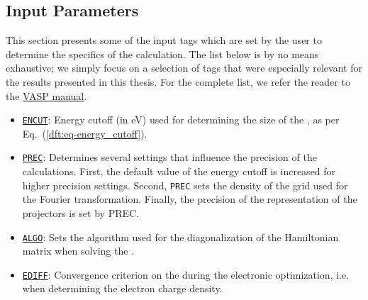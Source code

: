 \begin{refsection}
\subsection{Input Parameters} \label{appendix:sec-input} 
 
This section presents some of the input tags which are set by 
the user to determine the specifics of the calculation. The list below is by 
no means exhaustive; we simply focus on a selection of tags that were 
especially relevant for the results presented in this thesis. For the complete 
list, we refer the reader to the 
\href{https://www.vasp.at/wiki/index.php/The_VASP_Manual}{\gls{VASP} manual}. 
 
\begin{itemize} 
 
 \label{appendix:sec-ENCUT} 
\item \href{https://cms.mpi.univie.ac.at/wiki/index.php/ENCUT}{\texttt{ENCUT}}: 
Energy cutoff (in \si{\electronvolt}) used for determining the size of the 
, as per 
Eq.~(\ref{dft:eq-energy_cutoff}).
 
 \label{appendix:sec-PREC} 
\item \href{https://cms.mpi.univie.ac.at/wiki/index.php/PREC}{\texttt{PREC}}: 
Determines several settings that influence the precision of the calculations. 
First, the default value of the energy cutoff is increased for higher precision 
settings. Second, \texttt{PREC} sets the density of the grid used for the 
Fourier transformation. Finally, the precision of the representation of the 
 projectors is set by PREC.
 
 \label{appendix:sec-ALGO} 
\item \href{https://cms.mpi.univie.ac.at/wiki/index.php/ALGO}{\texttt{ALGO}}: 
Sets the algorithm used for the diagonalization of the Hamiltonian matrix 
when solving the .

 \label{appendix:sec-EDIFF} 
\item \href{https://cms.mpi.univie.ac.at/wiki/index.php/EDIFF}{\texttt{EDIFF}}: 
Convergence criterion on the  
during the electronic optimization, i.e. when determining the electron charge 
density.
 

\end{itemize}
\end{refsection}

